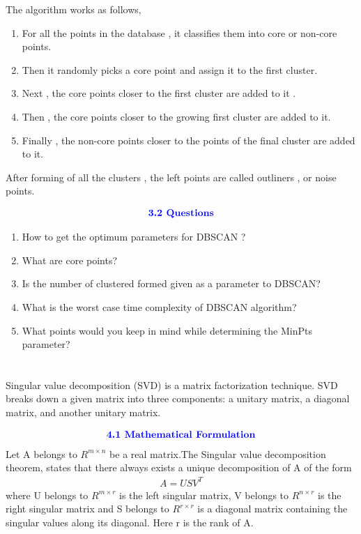 \documentclass[12pt,a4paper]{article}
\begin{document}
{The algorithm works as follows,
\begin{enumerate}
    \item For all the points in the database , it classifies them into core or non-core points.
    \item Then it randomly picks a core point and assign it to the first cluster.
    \item Next , the core points closer to the first cluster are added to it .
    \item Then , the core points closer to the growing first cluster are added to it.
    \item Finally , the non-core points closer to the points of the final cluster are added to it.
\end{enumerate}

After forming of all the clusters , the left points are called outliners , or noise points.

\begin{align*}
    \textcolor{blue}{\text{{\textbf{3.2 Questions}}}}
\end{align*}

\begin{enumerate}
    \item How to get the optimum parameters for DBSCAN ?
    \item  What are core points?
    \item Is the number of clustered formed given as a parameter to DBSCAN?
    \item What is the worst case time complexity of DBSCAN algorithm?
    \item What points would you keep in mind while determining the MinPts parameter?
\\[10pt]
\end{enumerate}


\section{}
Singular value decomposition (SVD) is a matrix factorization technique. SVD breaks down a given matrix into three components: a unitary matrix, a diagonal matrix, and another unitary matrix. 

\begin{align*}
   \textcolor{blue}{ \text{{\textbf{4.1 Mathematical Formulation}}}}
\end{align*}
Let A belongs to $R^{m × n}$ be a real matrix.The Singular value decomposition theorem, states that there always exists a unique decomposition of
A of the form
\begin{align*}
    A = USV^T
\end{align*}
where U belongs to $R^{m \times r}$ is the left singular matrix, V belongs to $R^{n\times r}$ is the right singular matrix and S belongs to $R^{r\times r}$ is a diagonal matrix containing the singular values along its diagonal. Here r is the rank of A.

}
\end{document}
